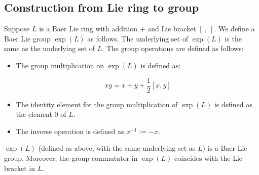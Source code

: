 \subsection{Construction from Lie ring to group}\label{sec:baer-lie-ring-to-group}

Suppose $L$ is a Baer Lie ring with addition $+$ and Lie bracket $[
  \ , \ ]$. We define a Baer Lie group $\exp(L)$ as follows. The
underlying set of $\exp(L)$ is the same as the underlying set of
$L$. The group operations are defined as follows:

\begin{itemize}
\item The group multiplication on $\exp(L)$ is defined as:

  $$xy = x + y + \frac{1}{2}[x,y]$$
\item The identity element for the group multiplication of $\exp(L)$ is
  defined as the element $0$ of $L$.
\item The inverse operation is defined as $x^{-1} := -x$.
\end{itemize}

\begin{lemma}\label{lemma:baer-correspondence-lie-ring-to-group}
  $\exp(L)$ (defined as above, with the same underlying set as $L$) is
  a Baer Lie group. Moreover, the group commutator in $\exp(L)$
  coincides with the Lie bracket in $L$.
\end{lemma}

